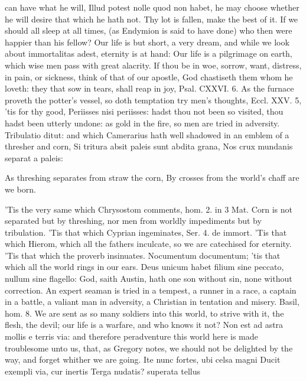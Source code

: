 {can have what he will, Illud potest nolle quod non habet, he may choose
whether he will desire that which he hath not. Thy lot is fallen, make
the best of it. If we should all sleep at all times, (as Endymion
is said to have done) who then were happier than his fellow? Our life
is but short, a very dream, and while we look about immortalitas
adest, eternity is at hand: Our life is a pilgrimage on earth,
which wise men pass with great alacrity. If thou be in woe, sorrow,
want, distress, in pain, or sickness, think of that of our apostle, God
chastiseth them whom he loveth: they that sow in tears, shall reap in
joy, Psal. CXXVI. 6. As the furnace proveth the potter's vessel, so
doth temptation try men's thoughts, Eccl. XXV. 5, 'tis for thy
good, Periisses nisi periisses: hadst thou not been so visited, thou
hadst been utterly undone: as gold in the fire, so men are tried in
adversity. Tribulatio ditut: and which Camerarius hath well shadowed in
an emblem of a thresher and corn,
Si tritura absit paleis sunt abdita grana,
Nos crux mundanis separat a paleis:

As threshing separates from straw the corn,
By crosses from the world's chaff are we born.

'Tis the very same which Chrysostom comments, hom. 2. in 3 Mat.
Corn is not separated but by threshing, nor men from worldly
impediments but by tribulation. 'Tis that which Cyprian
ingeminates, Ser. 4. de immort. 'Tis that which Hierom, which all
the fathers inculcate, so we are catechised for eternity. 'Tis that
which the proverb insinuates. Nocumentum documentum; 'tis that which
all the world rings in our ears. Deus unicum habet filium sine peccato,
nullum sine flagello: God, saith Austin, hath one son without
sin, none without correction. An expert seaman is tried in a
tempest, a runner in a race, a captain in a battle, a valiant man in
adversity, a Christian in tentation and misery. Basil, hom. 8. We are
sent as so many soldiers into this world, to strive with it, the flesh,
the devil; our life is a warfare, and who knows it not? Non est
ad astra mollis e terris via: and therefore peradventure this
world here is made troublesome unto us, that, as Gregory notes, we
should not be delighted by the way, and forget whither we are going.
Ite nunc fortes, ubi celsa magni
Ducit exempli via, cur inertis
Terga nudatis? superata tellus

}
